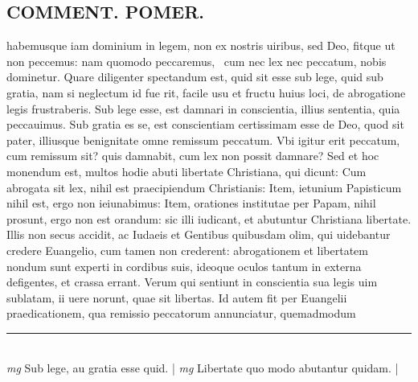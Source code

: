 \documentclass{article}
\begin{document}
\begin{pages}
\section*{COMMENT. POMER.  }\pstart habemusque iam dominium in legem, non ex nostris uiribus, sed Deo, fitque ut non peccemus: nam quomodo peccaremus,  cum nec lex nec peccatum, nobis dominetur. Quare diligenter spectandum est, quid sit esse sub lege, quid sub gratia, nam si neglectum id fue rit, facile usu et fructu huius loci, de abrogatione legis frustraberis. Sub lege esse, est damnari in conscientia, illius sententia, quia peccauimus. Sub gratia es se, est conscientiam certissimam esse de Deo, quod sit pater, illiusque benignitate omne remissum peccatum. Vbi igitur erit peccatum, cum remissum sit? quis damnabit, cum lex non possit damnare? Sed et hoc monendum est, multos hodie abuti libertate Christiana, qui dicunt: Cum abrogata sit lex, nihil est praecipiendum Christianis: Item, ietunium Papisticum nihil est, ergo non ieiunabimus: Item, orationes institutae per Papam, nihil prosunt, ergo non est orandum: sic illi iudicant, et abutuntur Christiana libertate. Illis non secus accidit, ac Iudaeis et Gentibus quibusdam olim, qui uidebantur credere Euangelio, cum tamen non crederent: abrogationem et libertatem nondum sunt experti in cordibus suis, ideoque oculos tantum in externa defigentes, et crassa errant. Verum qui sentiunt in conscientia sua legis uim sublatam, ii uere norunt, quae sit libertas.  Id autem fit per Euangelii praedicationem, qua remissio peccatorum annunciatur, quemadmodum  \pend
\vspace{0.5cm}\noindent
\vspace{0.2cm}\rule{1cm}{0.2pt}\\ 
\hspace{0.2cm}\textit{mg}
\footnotesize Sub lege, au gratia esse quid.  
\normalsize| 
\hspace{0.2cm}\textit{mg}
\footnotesize Libertate quo modo abutantur quidam.  
\normalsize| 

\end{pages}
\end{document}
